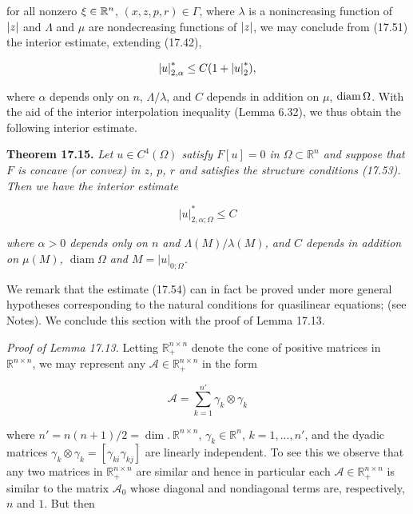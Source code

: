 \noindent for all nonzero $\xi \in \R^n$, $(x,z,p,r) \in \Gamma$, where $\lambda$ is a nonincreasing function of $\abs{z}$ and $\Lambda$ and $\mu$ are nondecreasing functions of $\abs{z}$, we may conclude from (17.51) the interior estimate, extending (17.42),

\begin{equation*}
\abs{u}^{*}_{2,\alpha} \le C(1 + \abs{u}^{*}_{2}),
\end{equation*}

\noindent where $\alpha$ depends only on $n$, $\Lambda/\lambda$, and $C$ depends in addition on $\mu$, $\diam \Omega$. With the aid of the interior interpolation inequality (Lemma 6.32), we thus obtain the following interior estimate.


\providecommand{\R}{\mathbb{R}}
\providecommand{\abs}[1]{\left|#1\right|}
\providecommand{\diam}{\operatorname{diam}}

\textbf{Theorem 17.15.} \emph{Let $u \in C^4(\Omega)$ satisfy $F[u] = 0$ in $\Omega \subset \R^n$ and suppose that $F$ is concave (or convex) in $z$, $p$, $r$ and satisfies the structure conditions (17.53). Then we have the interior estimate}

\begin{equation}\tag{17.54}
\abs{u}^{*}_{2,\alpha;\Omega} \le C
\end{equation}

\noindent \emph{where $\alpha > 0$ depends only on $n$ and $\Lambda(M)/\lambda(M)$, and $C$ depends in addition on $\mu(M)$, $\diam \Omega$ and $M = \abs{u}_{0;\Omega}$.}

\medskip

We remark that the estimate (17.54) can in fact be proved under more general hypotheses corresponding to the natural conditions for quasilinear equations; (see Notes). We conclude this section with the proof of Lemma 17.13.

\medskip

\textit{Proof of Lemma 17.13.} \quad Letting $\R^{n\times n}_+$ denote the cone of positive matrices in $\R^{n\times n}$, we may represent any $\mathscr{A} \in \R^{n\times n}_+$ in the form

\begin{equation}\tag{17.55}
\mathscr{A} = \sum_{k=1}^{n'} \gamma_k \otimes \gamma_k
\end{equation}

\noindent where $n' = n(n + 1)/2 = \dim.\ \R^{n\times n}$, $\gamma_k \in \R^n$, $k = 1, . . . , n'$, and the dyadic matrices
$\gamma_k \otimes \gamma_k = [\gamma_{ki}\gamma_{kj}]$ are linearly independent. To see this we observe that any two matrices in $\R^{n\times n}_+$ are similar and hence in particular each $\mathscr{A} \in \R^{n\times n}_+$ is similar to the matrix $\mathscr{A}_0$ whose diagonal and nondiagonal terms are, respectively, $n$ and $1$. But then

